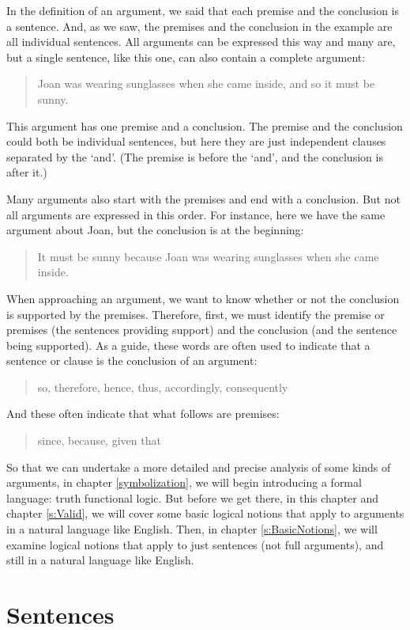 In the definition of an argument, we said that each premise and the conclusion is a sentence. And, as we saw, the premises and the conclusion in the example are all individual sentences. All arguments can be expressed this way and many are, but a single sentence, like this one, can also contain a complete argument:
	\begin{quote}
		Joan was wearing sunglasses when she came inside, and so it must be sunny.
	\end{quote}
This argument has one premise and a conclusion. The premise and the conclusion could both be individual sentences, but here they are just independent clauses separated by the `and'. (The premise is before the `and', and the conclusion is after it.)

Many arguments also start with the premises and end with a conclusion. But not all arguments are expressed in this order. For instance, here we have the same argument about Joan, but the conclusion is at the beginning:
	\begin{quote}
		It must be sunny because Joan was wearing sunglasses when she came inside.
	\end{quote}

When approaching an argument, we want to know whether or not the conclusion is supported by the premises. Therefore, first, we must identify the premise or premises (the sentences providing support) and the conclusion (and the sentence being supported). As a guide, these words are often used to indicate that a sentence or clause is the conclusion of an argument:
	\begin{quote}
		so, therefore, hence, thus, accordingly, consequently
	\end{quote}
And these often indicate that what follows are premises:
	\begin{quote}
		since, because, given that
	\end{quote}

So that we can undertake a more detailed and precise analysis of some kinds of arguments, in chapter \ref{symbolization}, we will begin introducing a formal language: truth functional logic. But before we get there, in this chapter and chapter \ref{s:Valid}, we will cover some basic logical notions that apply to arguments in a natural language like English. Then, in chapter \ref{s:BasicNotions},  we will examine logical notions that apply to just sentences (not full arguments), and still in a natural language like English.


\section{Sentences}
\label{intro.sentences}

